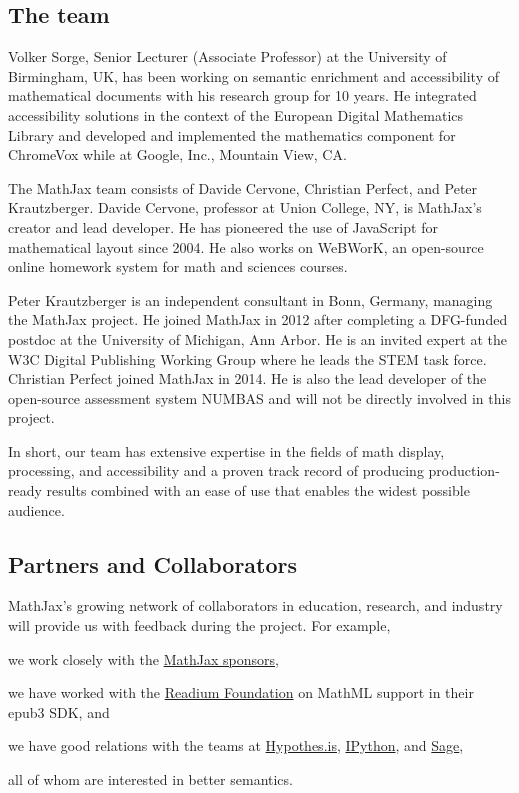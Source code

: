 \documentclass[12pt]{amsart}
\begin{document}
\subsection{The team}

Volker Sorge, Senior Lecturer (Associate Professor) at the University of 
Birmingham, UK, has been working on semantic enrichment and accessibility of 
mathematical documents with his research group for 10 years. He integrated 
accessibility solutions in the context of the European Digital Mathematics 
Library and developed and implemented the mathematics component for ChromeVox 
while at Google, Inc., Mountain View, CA.

The MathJax team consists of Davide Cervone, Christian Perfect, and Peter 
Krautzberger. Davide Cervone, professor at Union College, NY, is MathJax's 
creator and lead developer. He has  pioneered the use of JavaScript for 
mathematical layout since 2004. He also works on WeBWorK, an open-source online 
homework system for math and sciences courses.

Peter Krautzberger is an independent consultant in Bonn, Germany, managing the 
MathJax project. He joined MathJax in 2012 after completing a DFG-funded postdoc 
at the University of Michigan, Ann Arbor. He is an invited expert at the W3C 
Digital Publishing Working Group where he leads the STEM task force. Christian 
Perfect joined MathJax in 2014. He is also the lead developer of the open-source 
assessment system NUMBAS and will not be directly involved in this project.

In short, our team has extensive expertise in the fields of math display, 
processing, and accessibility and a proven track record of producing 
production-ready results combined with an ease of use that enables the widest 
possible audience. 

\subsection{Partners and Collaborators}

MathJax's growing network of collaborators in education, research, and industry 
will provide us with feedback during the project. For example,
\begin{inparaenum}[(a)]
\item we work closely with the \href{http://www.mathjax.org/sponsors/}{MathJax 
sponsors},
\item we have worked with the \href{http://readium.org/}{Readium Foundation} on 
MathML support in their 
epub3 SDK, and 
\item we have good relations with the teams at 
\href{http://hypothes.is/}{Hypothes.is}, \href{http://ipython.org/}{IPython}, 
and \href{http://www.sagemath.org/}{Sage},
\end{inparaenum}
all of whom are interested in better semantics.
\end{document}
